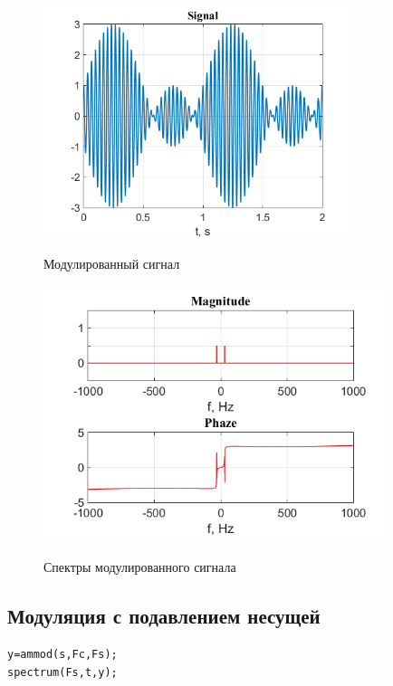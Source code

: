 \documentclass[a4paper,14pt]{article}
\begin{document}
\begin{figure}[h]
\begin{multicols}{1}
\hfill
\includegraphics[width=90mm]{am1_3}
\hfill
\caption{Модулированный сигнал}
\label{figBottom}
\hfill
\includegraphics[width=100mm]{am1_3_spec}
\hfill
\caption{Спектры модулированного сигнала}
\label{figDown}
\end{multicols}
\end{figure}

\newpage
\subsection{Модуляция с подавлением несущей}

\begin{lstlisting}
y=ammod(s,Fc,Fs);
spectrum(Fs,t,y);
\end{lstlisting}
\end{document}
